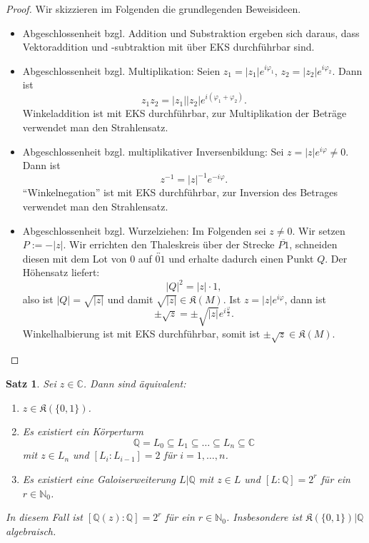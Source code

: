 \documentclass[a4paper, twoside, 11pt, ngerman]{report}
\newcommand{\CC}{\mathds C}
\newcommand{\NN}{\mathds N}
\newcommand{\QQ}{\mathds Q}
\newcommand{\frakK}{\mathfrak K}
\theoremstyle{definistyle}
\newtheorem{satz}{Satz}[section]
\theoremstyle{remark}
\begin{document}
\begin{proof} Wir skizzieren im Folgenden die grundlegenden Beweisideen.
\begin{itemize}
\item Abgeschlossenheit bzgl. Addition und Substraktion ergeben sich daraus, dass
Vektoraddition und -subtraktion mit über EKS durchführbar sind.
\item Abgeschlossenheit bzgl. Multiplikation: Seien $z_1 = |z_1| e^{i \varphi_1}$, $z_2 = |z_2| e^{i \varphi_2}$. Dann ist 
\[
z_1 z_2 = |z_1| |z_2| e^{i (\varphi_1 + \varphi_2)}.
\]
Winkeladdition ist mit EKS durchführbar, zur Multiplikation der Beträge verwendet man den Strahlensatz.
\item Abgeschlossenheit bzgl. multiplikativer Inversenbildung: Sei $z = |z| e^{i \varphi} \neq 0$. Dann ist 
\[
z^{-1} = |z|^{-1} e^{-i \varphi}.
\]
"`Winkelnegation"' ist mit EKS durchführbar, zur Inversion des Betrages verwendet man den Strahlensatz.
\item Abgeschlossenheit bzgl. Wurzelziehen: Im Folgenden sei $z\neq0$. Wir setzen $P:=-|z|$.
Wir errichten den Thaleskreis über der Strecke $\overline{P1}$, schneiden diesen mit dem Lot von $0$ auf $\overleftrightarrow{01}$ und erhalte dadurch einen Punkt $Q$. 
Der Höhensatz liefert: 
\[
|Q|^2 = |z| \cdot 1,
\]
also ist $|Q| = \sqrt{|z|}$ und damit $\sqrt{|z|} \in \frakK(M)$.
Ist $z = |z| e^{i \varphi}$, dann ist 
\[
\pm \sqrt{z} = \pm \sqrt{|z|} e^{i \frac{\varphi}{2}}.
\]
Winkelhalbierung ist mit EKS durchführbar, somit ist $\pm \sqrt{z} \in \frakK(M)$.
\end{itemize}
\end{proof}

\begin{satz}\label{satz:char_konstruierbarkeit}
Sei $z \in \CC$. Dann sind äquivalent:
\begin{enumerate}[label=(\roman*)]
    \item $z \in \frakK(\{0,1\})$.
    \item Es existiert ein Körperturm
    \[
    \QQ = L_0 \subseteq L_1 \subseteq \dots \subseteq L_n \subseteq \CC
    \]
    mit $z \in L_n$ und $[L_i : L_{i-1}] = 2$ für $i = 1, \dots, n$.
    \item Es existiert eine Galoiserweiterung $L|\QQ$ mit $z \in L$ und $[L : \QQ] = 2^r$ für ein $r \in \NN_0$.
\end{enumerate}

In diesem Fall ist $[\QQ(z) : \QQ] = 2^r$ für ein $r \in \NN_0$. Insbesondere ist
$\frakK(\{0,1\}) | \QQ$ algebraisch.
\end{satz}
\end{document}
